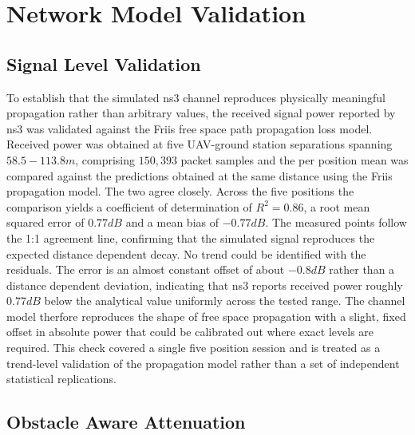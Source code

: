 \section{Network Model Validation}

\subsection{Signal Level Validation}

To establish that the simulated ns3 channel reproduces physically meaningful propagation rather than arbitrary values, the received signal power reported by ns3 was validated against the Friis free space path propagation loss model. Received power was obtained at five UAV-ground station separations spanning $58.5 - 113.8m$, comprising $150,393$ packet samples and the per position mean was compared against the predictions obtained at the same distance using the Friis propagation model. The two agree closely. Across the five positions the comparison yields a coefficient of determination of $R^2 = 0.86$, a root mean squared error of $0.77dB$ and a mean bias of $-0.77dB$. The measured points follow the 1:1 agreement line, confirming that the simulated signal reproduces the expected distance dependent decay. No trend could be identified with the residuals. The error is an almost constant offset of about $-0.8dB$ rather than a distance dependent deviation, indicating that ns3 reports received power roughly $0.77dB$ below the analytical value uniformly across the tested range. The channel model therfore reproduces the shape of free space propagation with a slight, fixed offset in absolute power that could be calibrated out where exact levels are required. This check covered a single five position session and is treated as a trend-level validation of the propagation model rather than a set of independent statistical replications.


\subsection{Obstacle Aware Attenuation}


